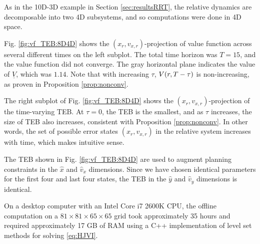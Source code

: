 As in the 10D-3D example in Section \ref{sec:resultsRRT}, the relative dynamics are decomposable into two 4D subsystems, and so computations were done in 4D space.

Fig. \ref{fig:vf_TEB:8D4D} shows the $(x_r, v_{x,r})$-projection of value function across several different times on the left subplot.
The total time horizon was $T=15$, and the value function did not converge.
The gray horizontal plane indicates the value of $\underline V$, which was $1.14$.
Note that with increasing $\tau$, $V(r,T-\tau)$ is non-increasing, as proven in Proposition \ref{prop:nonconv}.

The right subplot of Fig. \ref{fig:vf_TEB:8D4D} shows the $(x_r, v_{x,r})$-projection of the time-varying TEB.
At $\tau=0$, the TEB is the smallest, and as $\tau$ increases, the size of TEB also increases, consistent with Proposition \ref{prop:nonconv}.
In other words, the set of possible error states $(x_r, v_{x,r})$ in the relative system increases with time, which makes intuitive sense.

The TEB shown in Fig. \ref{fig:vf_TEB:8D4D} are used to augment planning constraints in the $\hat x$ and $\hat v_x$ dimensions.
Since we have chosen identical parameters for the first four and last four states, the TEB in the $\hat y$ and $\hat v_y$ dimensions is identical.

On a desktop computer with an Intel Core i7 2600K CPU, the offline computation on a $81\times81\times65\times65$ grid took approximately 35 hours and  required approximately 17 GB of RAM using a C++ implementation of level set methods for solving \eqref{eq:HJVI}.

